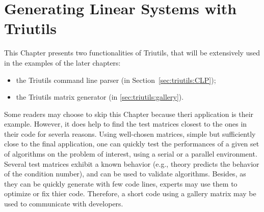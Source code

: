 % 
% 
% 
%  
%  
% 

\section{Generating Linear Systems with Triutils}
\label{chap:triutils}

This Chapter presents two functionalities of Triutils, that will be
extensively used in the examples of the later chapters: 
\begin{itemize}
\item the Triutils command line parser (in
  Section~\ref{sec:triutils:CLP});
\item the Triutils matrix generator (in \ref{sec:triutils:gallery}).
\end{itemize}
Some readers may choose to skip this Chapter because theri application
is their example. However, it does help to find the test matrices
closest to the ones in their code for severla reasons.  Using
well-chosen matrices, simple but sufficiently close to the final
application, one can quickly test the performances of a given set of
algorithms on the problem of interest, using a serial or a parallel
environment. Several test matrices exhibit a known behavior (e.g.,
theory predicts the behavior of the condition number), and can be used
to validate algorithms. Besides, as they can be quickly generate with
few code lines, experts may use them to optimize or fix thier code.
Therefore, a short code using a gallery matrix may be used to
communicate with developers.

